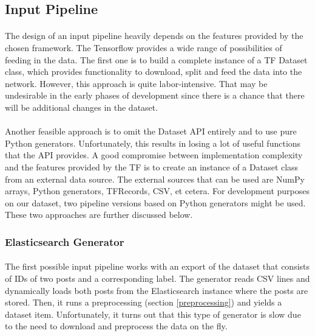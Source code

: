 \subsection{Input Pipeline}\label{input_pipelines}
\paragraph{}
The design of an input pipeline heavily depends on the features provided by the chosen framework. The Tensorflow provides a wide range of possibilities of feeding in the data. The first one is to build a complete instance of a TF Dataset class, which provides functionality to download, split and feed the data into the network. However, this approach is quite labor-intensive. That may be undesirable in the early phases of development since there is a chance that there will be additional changes in the dataset.

\paragraph{}
Another feasible approach is to omit the Dataset API entirely  and to use pure Python generators. Unfortunately, this results in losing a lot of useful functions that the API provides. A good compromise between implementation complexity and the features provided by the TF is to create an instance of a Dataset class from an external data source. The external sources that can be used are NumPy arrays, Python generators, TFRecords, CSV, et cetera. For development purposes on our dataset, two pipeline versions based on Python generators might be used. These two approaches are further discussed below.

\subsubsection{Elasticsearch Generator}
\paragraph{}
The first possible input pipeline works with an export of the dataset that consists of IDs of two posts and a corresponding label. The generator reads CSV lines and dynamically loads both posts from the Elasticsearch instance where the posts are stored. Then, it runs a preprocessing (section \ref{preprocessing}) and yields a dataset item. Unfortunately, it turns out that this type of generator is slow due to the need to download and preprocess the data on the fly.

